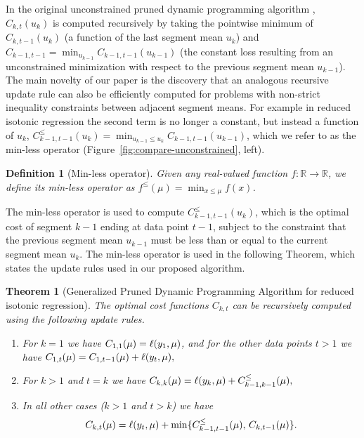 \documentclass[aoas]{imsart}
\newtheorem{theorem}{Theorem}
\newtheorem{definition}{Definition}
\newcommand{\RR}{\mathbb R}
\begin{document}
In the original unconstrained pruned dynamic programming algorithm
\citep{pruned-dp}, $C_{k,t}(u_k)$ is computed recursively by taking
the pointwise minimum of $C_{k,t-1}(u_k)$ (a function of the last
segment mean $u_k$) and
$\hat C_{k-1,t-1} = \min_{u_{k-1}} C_{k-1,t-1}(u_{k-1})$ (the constant
loss resulting from an unconstrained minimization with respect to the
previous segment mean $u_{k-1}$). The main novelty of our paper is the
discovery that an analogous recursive update rule can also be
efficiently computed for problems with non-strict inequality constraints between adjacent segment means. For example in reduced
isotonic regression the second term is no longer a constant, but
instead a function of $u_k$,
$C_{k-1,t-1}^{\leq}(u_k) = \min_{u_{k-1}\leq u_k}
C_{k-1,t-1}(u_{k-1})$, which we refer to as the min-less operator
(Figure~\ref{fig:compare-unconstrained}, left).

\begin{definition}[Min-less operator]
\label{def:min-less}
  Given any real-valued function $f:\RR\rightarrow\RR$, we define its min-less
  operator as $f^\leq(\mu)=\min_{x\leq \mu} f(x)$.
\end{definition}

The min-less operator is used to compute $C_{k-1,t-1}^\leq(u_k)$,
which is the optimal cost of segment $k-1$ ending at data point $t-1$,
subject to the constraint that the previous segment mean $u_{k-1}$
must be less than or equal to the current segment mean $u_k$. The
min-less operator is used in the following Theorem, which states the
update rules used in our proposed algorithm.

\begin{theorem}[Generalized Pruned Dynamic Programming Algorithm
  for reduced isotonic regression]
\label{thm:gpdpa}
  The optimal cost functions $C_{k,t}$ can be recursively computed
  using the following update rules.
\begin{enumerate}
\item For $k=1$ we have
$C_{1,1}(\mu)=\ell(y_1,\mu)$, and for the other data
  points $t>1$ we have
$
C_{1,t}(\mu)=C_{1,t-1}(\mu)+\ell(y_t,\mu),
$
\item For $k>1$ and $t=k$ we have
$
  C_{k,k}(\mu)=\ell(y_k, \mu)+C_{k-1,k-1}^\leq(\mu),
$
\item In all other cases ($k>1$ and $t>k$) we have
 $$
  C_{k,t}(\mu)=\ell(y_t,\mu)+
  \min\{
  C_{k-1,t-1}^\leq(\mu),\,
  C_{k,t-1}(\mu)
  \}.
$$
\end{enumerate}
\end{theorem}
\end{document}
